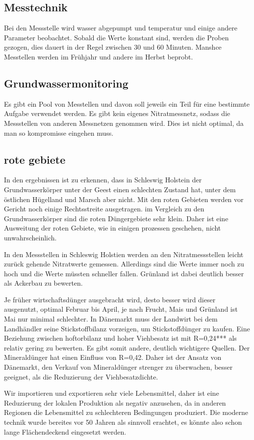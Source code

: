 \documentclass[11pt]{scrbook}
\begin{document}
\subsection{Messtechnik}
Bei den Messstelle wird wasser abgepumpt und temperatur und einige andere Parameter beobachtet.
Sobald die Werte konstant sind, werden die Proben gezogen, dies dauert in der Regel zwischen 30 und 60 Minuten.
Manshce Messtellen werden im Frühjahr und andere im Herbst beprobt.

\subsection{Grundwassermonitoring}
Es gibt ein Pool von Messtellen und davon soll jeweils ein Teil für eine bestimmte Aufgabe verwendet werden.
Es gibt kein eigenes Nitratmessnetz, sodass die Messstellen von anderen Messnetzen genommen wird.
Dies ist nicht optimal, da man so kompromisse eingehen muss.

\subsection{rote gebiete}
In den ergebnissen ist zu erkennen, dass in Schleswig Holstein der Grundwasserkörper unter der Geest einen schlechten Zustand hat, unter dem östlichen Hügelland und Marsch aber nicht.
Mit den roten Gebieten werden vor Gericht noch einige Rechtsstreite ausgetragen.
im Vergleich zu den Grundwasserkörper sind die roten Düngergebiete sehr klein.
Daher ist eine Ausweitung der roten Gebiete, wie in einigen prozessen geschehen, nicht unwahrscheinlich.

In den Messstellen in Schleswig Holstien werden an den Nitratmessstellen leicht zurück gehende Nitratwerte gemessen.
Allerdings sind die Werte immer noch zu hoch und die Werte müssten schneller fallen.
Grünland ist dabei deutlich besser als Ackerbau zu bewerten.

Je früher wirtschaftsdünger ausgebracht wird, desto besser wird dieser ausgenutzt, optimal Februar bis April, je nach Frucht, Mais und Grünland ist Mai nur minimal schlechter.
In Dänemarkt muss der Landwirt bei dem Landhändler seine Stickstoffbilanz vorzeigen, um Stickstoffdünger zu kaufen.
Eine Beziehung zwischen hoftorbilanz und hoher Viehbesatz ist mit R=0,24*** als relativ gering zu bewerten.
Es gibt somit andere, deutlich wichtigere Quellen.
Der Mineraldünger hat einen Einfluss von R=0,42.
Daher ist der Ansatz von Dänemarkt, den Verkauf von Mineraldünger strenger zu überwachen, besser geeignet, als die Reduzierung der Viehbesatzdichte.


Wir importieren und exportieren sehr viele Lebensmittel, daher ist eine Reduzierung der lokalen Produktion als negativ anzusehen, da in anderen Regionen die Lebensmittel zu schlechteren Bedingungen produziert.
Die moderne technik wurde bereites vor 50 Jahren als sinnvoll erachtet, es könnte also schon lange Flächendeckend eingesetzt werden.

\end{document}
